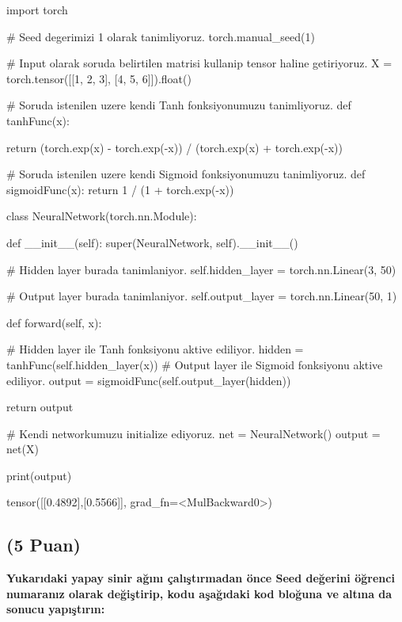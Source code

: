 \documentclass[11pt]{article}
\begin{document}
\begin{python}
import torch

# Seed degerimizi 1 olarak tanimliyoruz.
torch.manual_seed(1)

# Input olarak soruda belirtilen matrisi kullanip tensor haline getiriyoruz.
X = torch.tensor([[1, 2, 3], [4, 5, 6]]).float()

# Soruda istenilen uzere kendi Tanh fonksiyonumuzu tanimliyoruz.
def tanhFunc(x):

    return (torch.exp(x) - torch.exp(-x)) / (torch.exp(x) + torch.exp(-x))

# Soruda istenilen uzere kendi Sigmoid fonksiyonumuzu tanimliyoruz.
def sigmoidFunc(x):
    return 1 / (1 + torch.exp(-x))

class NeuralNetwork(torch.nn.Module):

    def __init__(self):
        super(NeuralNetwork, self).__init__()

        # Hidden layer burada tanimlaniyor.
        self.hidden_layer = torch.nn.Linear(3, 50)

        # Output layer burada tanimlaniyor.
        self.output_layer = torch.nn.Linear(50, 1)

    def forward(self, x):

        # Hidden layer ile Tanh fonksiyonu aktive ediliyor.
        hidden = tanhFunc(self.hidden_layer(x))
        # Output layer ile Sigmoid fonksiyonu aktive ediliyor.
        output = sigmoidFunc(self.output_layer(hidden))

        return output

# Kendi networkumuzu initialize ediyoruz.
net = NeuralNetwork()
output = net(X)

print(output)



\end{python}

tensor([[0.4892],[0.5566]], grad_fn=<MulBackward0>)


\subsection{(5 Puan)} \textbf{Yukarıdaki yapay sinir ağını çalıştırmadan önce Seed değerini öğrenci numaranız olarak değiştirip, kodu aşağıdaki kod bloğuna ve altına da sonucu yapıştırın:}
\end{document}
